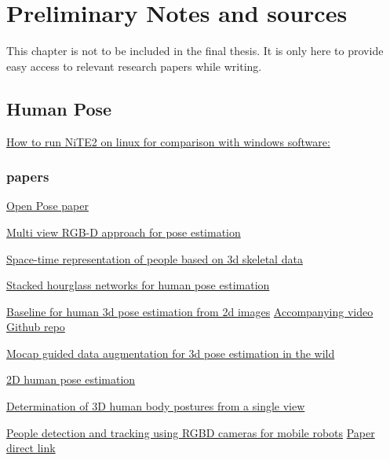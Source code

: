 \chapter*{Preliminary Notes and sources}

{\color{red}\Large This chapter is not to be included in the final thesis. It is only here to provide easy access to relevant research papers while writing.}

\section{Human Pose}
\href{https://autostudentsite.wordpress.com/2017/05/18/running-and-building-nite2-samples-for-kinect-v2/}{How to run NiTE2 on linux for comparison with windows software:}

\subsection{papers}

\href{https://arxiv.org/pdf/1611.08050.pdf}{Open Pose paper}

\href{https://arxiv.org/pdf/1701.07372.pdf}{Multi view RGB-D approach for pose estimation}

\href{https://arxiv.org/pdf/1601.01006.pdf}{Space-time representation of people based on 3d skeletal data}

\href{https://arxiv.org/pdf/1603.06937.pdf}{Stacked hourglass networks for human pose estimation}

\href{https://arxiv.org/pdf/1705.03098.pdf}{Baseline for human 3d pose estimation from 2d images}
\href{https://www.youtube.com/watch?v=Hmi3Pd9x1BE&feature=youtu.be}{Accompanying video}
\href{https://github.com/una-dinosauria/3d-pose-baseline}{Github repo}

\href{https://arxiv.org/pdf/1607.02046.pdf}{Mocap guided data augmentation for 3d pose estimation in the wild}

\href{http://human-pose.mpi-inf.mpg.de/contents/andriluka14cvpr.pdf}{2D human pose estimation}

\href{https://www.sciencedirect.com/science/article/pii/0734189X85900945}{Determination of 3D human body postures from a single view}

\href{http://journals.sagepub.com/doi/full/10.1177/1729881416657746}{People detection and tracking using RGBD cameras for mobile robots}
\href{http://journals.sagepub.com/doi/pdf/10.1177/1729881416657746}{Paper direct link}

